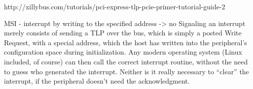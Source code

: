 http://xillybus.com/tutorials/pci-express-tlp-pcie-primer-tutorial-guide-2

MSI - interrupt by writing to the specified address -> no 
Signaling an interrupt merely consists of sending a TLP over the bus,
which is simply a posted Write Request, with a special address,
which the host has written into the peripheral’s configuration space during initialization.
Any modern operating system (Linux included, of course) can then call the correct interrupt routine,
without the need to guess who generated the interrupt.
Neither is it really necessary to “clear” the interrupt, if the peripheral doesn’t need the acknowledgment.
